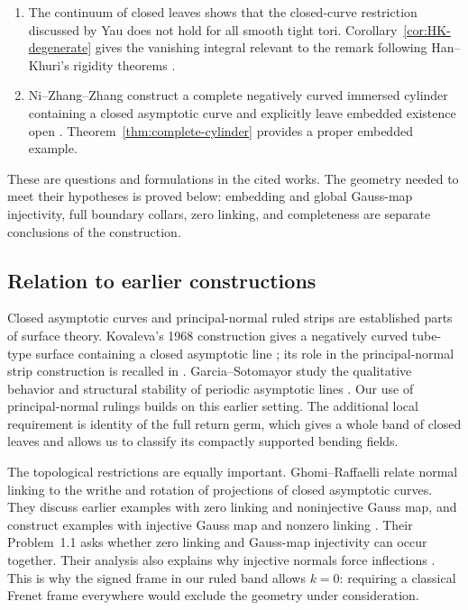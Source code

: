 \documentclass[11pt]{amsart}
\theoremstyle{definition}
\theoremstyle{remark}
\numberwithin{equation}{section}
\begin{document}
\begin{enumerate}[label=\textup{(\roman*)}]
negative-curvature annuli that agree on full boundary collars,
addressing \cite[Problem~1.3]{GhomiProblems}.
\item The continuum of closed leaves shows that the closed-curve
restriction discussed by Yau \cite[p.~236]{YauReview} does not hold
for all smooth tight tori. Corollary~\ref{cor:HK-degenerate} gives the
vanishing integral relevant to the remark following Han--Khuri's
rigidity theorems \cite[p.~464]{HK}.
\item Ni--Zhang--Zhang construct a complete negatively curved immersed
cylinder containing a closed asymptotic curve and explicitly leave
embedded existence open \cite[Theorem~3.4 and the following paragraph]{NiZhangZhang}.
Theorem~\ref{thm:complete-cylinder} provides a proper embedded example.
\end{enumerate}

These are questions and formulations in the cited works. The geometry
needed to meet their hypotheses is proved below: embedding and global
Gauss-map injectivity, full boundary collars, zero linking, and
completeness are separate conclusions of the construction.

\subsection{Relation to earlier constructions}
Closed asymptotic curves and principal-normal ruled strips are established
parts of surface theory. Kovaleva's 1968 construction gives a negatively
curved tube-type surface containing a closed asymptotic line
\cite{Kovaleva}; its role in the principal-normal strip construction
is recalled in \cite[Note~2.1]{GR}. Garcia--Sotomayor study the qualitative behavior and
structural stability of periodic asymptotic lines
\cite{GarciaSotomayor}. Our use of principal-normal rulings builds on
this earlier setting. The additional local requirement is identity of
the full return germ, which gives a whole band of closed leaves and
allows us to classify its compactly supported bending fields.

The topological restrictions are equally important. Ghomi--Raffaelli
relate normal linking to the writhe and rotation of projections of
closed asymptotic curves. They discuss earlier examples with zero
linking and noninjective Gauss map, and construct examples with
injective Gauss map and nonzero linking \cite[\S\S1,4]{GR}.
Their Problem~1.1 asks whether zero linking and Gauss-map injectivity
can occur together. Their analysis also explains why injective normals
force inflections \cite[Note~5.1]{GR}. This is why the signed frame in
our ruled band allows $k=0$: requiring a classical Frenet frame
everywhere would exclude the geometry under consideration.
\end{document}
